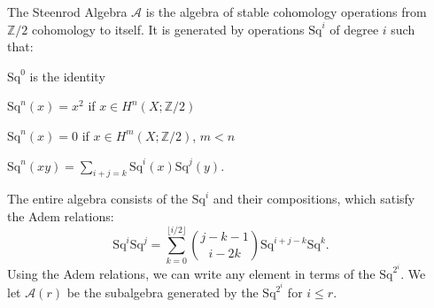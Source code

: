 \documentclass[final]{beamer}
\newcommand{\A}{\mathcal{A}}
\newcommand{\Z}{\mathbb{Z}}
\newcommand{\Sq}{\mathrm{Sq}}
\begin{document}
\begin{columns}[T]
\begin{column}{0.245\textwidth}
      The \alert{Steenrod Algebra} $\A$ is the algebra of stable cohomology operations from $\Z/2$ cohomology to itself.  It is generated by operations $\Sq^i$ of degree $i$ such that:
      \begin{bulletitemize}
        \item $\Sq^0$ is the identity
        \item $\Sq^n(x)=x^2$ if $x\in H^n(X;\Z/2)$
        \item $\Sq^n(x)=0$ if $x\in H^m(X;\Z/2)$, $m<n$
        \item $\Sq^n(xy)=\displaystyle\sum_{i+j=k} \Sq^i(x)\Sq^j(y)$.
      \end{bulletitemize}
      The entire algebra consists of the $\Sq^i$ and their compositions, which satisfy the \alert{Adem relations}:
      \[ \Sq^i\Sq^j = \sum_{k=0}^{\lfloor i/2 \rfloor} \binom{j-k-1}{i-2k}\Sq^{i+j-k}\Sq^k .\]
      Using the Adem relations, we can write any element in terms of the $\Sq^{2^i}$.  We let \alert{$\A(r)$} be the subalgebra generated by the $\Sq^{2^i}$ for $i\leq r$.
    \end{column}
    \begin{column}{0.495\textwidth} %

\end{column}
\end{columns}
\end{document}
